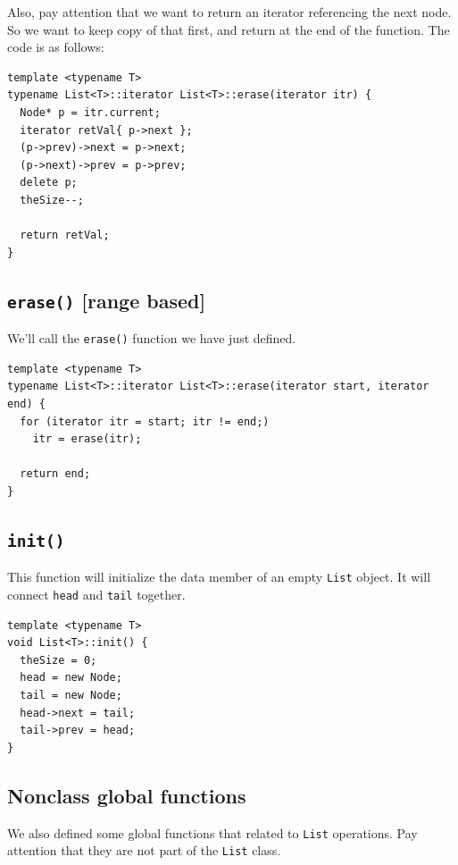 \documentclass[11pt]{book}
\begin{document}
Also, pay attention that we want to return an iterator referencing the next node. So we want to keep copy of that first, and return at the end of the function. The code is as follows:
\begin{verbatim}
template <typename T>
typename List<T>::iterator List<T>::erase(iterator itr) {
  Node* p = itr.current;
  iterator retVal{ p->next };
  (p->prev)->next = p->next;
  (p->next)->prev = p->prev;
  delete p;
  theSize--;

  return retVal;
}
\end{verbatim}
\subsection{\texttt{erase()} [range based]}
\label{sec:org19e357a}
We'll call the \texttt{erase()} function we have just defined.
\begin{verbatim}
template <typename T>
typename List<T>::iterator List<T>::erase(iterator start, iterator end) {
  for (iterator itr = start; itr != end;)
    itr = erase(itr);

  return end;
}
\end{verbatim}
\subsection{\texttt{init()}}
\label{sec:org6cd8418}
This function will initialize the data member of an empty \texttt{List} object. It will connect \texttt{head} and \texttt{tail} together.
\begin{verbatim}
template <typename T>
void List<T>::init() {
  theSize = 0;
  head = new Node;
  tail = new Node;
  head->next = tail;
  tail->prev = head;
}
\end{verbatim}
\subsection{Nonclass global functions}
\label{sec:org92533c6}
We also defined some global functions that related to \texttt{List} operations. Pay attention that they are not part of the \texttt{List} class. 
\end{document}
